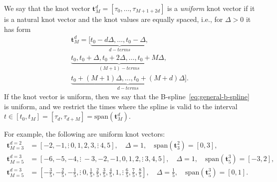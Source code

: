 \begin{definition}
We say that the knot vector $\mathbf{t}_M^d = [\tau_0, \dots, \tau_{M+1+2d}]$ is a {\em uniform} knot vector if it is a natural knot vector and the knot values are equally spaced, i.e., for $\Delta>0$ it has form
\begin{multline*}
\mathbf{t}_M^d = [\underbrace{t_0-d\Delta, \dots, t_0-\Delta,}_{d-terms} \\
			 \underbrace{t_0, t_0+\Delta, t_0+2\Delta, \dots, t_0+M\Delta,}_{(M+1)-terms} \\
			 \underbrace{t_0+(M+1)\Delta, \dots, t_0+(M+d)\Delta}_{d-terms}].	
\end{multline*}
If the knot vector is uniform, then we say that the B-spline~\eqref{eq:general-b-spline} is uniform, and we restrict the times where the spline is valid to the interval $t\in[t_0, t_M] = [\tau_d, \tau_{d+M}]=\text{span}(\mathbf{t}_M^d)$.
\end{definition}
For example, the following are uniform knot vectors:
\begin{align*}
	\mathbf{t}_{M=3}^{d=2} &= [-2, -1, \vdots~ 0, 1, 2, 3, \vdots~ 4, 5], \quad \Delta=1, \quad \text{span}(\mathbf{t}_3^2)=[0, 3], \\
	\mathbf{t}_{M=5}^{d=3} & = [-6, -5, -4,\vdots~  -3, -2, -1, 0, 1, 2, \vdots~ 3, 4, 5], \quad \Delta=1, \quad \text{span}(\mathbf{t}_5^3)=[-3, 2], \\
	\mathbf{t}_{M=5}^{d=3} & = [-\frac{3}{5}, -\frac{2}{5}, -\frac{1}{5}, \vdots~  0, \frac{1}{5}, \frac{2}{5}, \frac{3}{5}, \frac{4}{5}, 1, \vdots~  \frac{6}{5}, \frac{7}{5}, \frac{8}{5}], \quad \Delta=\frac{1}{5}, \quad \text{span}(\mathbf{t}_5^3)=[0, 1].	
\end{align*}

